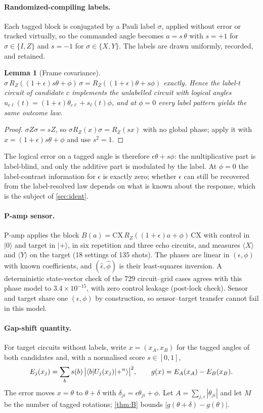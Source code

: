 \documentclass[10pt,twocolumn]{article}
\newtheorem{lemma}[theorem]{Lemma}
\theoremstyle{definition}
\theoremstyle{remark}
\newcommand{\eps}{\epsilon}
\newcommand{\RZ}{R_Z}
\begin{document}
\paragraph{Randomized-compiling labels.} Each tagged block is conjugated by a Pauli label $\sigma$, applied without error or tracked virtually, so the commanded angle becomes $a=s\,\theta$ with $s=+1$ for $\sigma\in\{I,Z\}$ and $s=-1$ for $\sigma\in\{X,Y\}$. The labels are drawn uniformly, recorded, and retained.

\begin{lemma}[Frame covariance]\label{lem:frame}
$\sigma\,\RZ((1+\eps)s\theta+\phi)\,\sigma=\RZ((1+\eps)\theta+s\phi)$ exactly. Hence the label-$t$ circuit of candidate $c$ implements the unlabelled circuit with logical angles $u_{c\ell}(t)=(1+\eps)\theta_{c\ell}+s_\ell(t)\phi$, and at $\phi=0$ every label pattern yields the same outcome law.
\end{lemma}
\begin{proof}
$\sigma Z\sigma=sZ$, so $\sigma\RZ(x)\sigma=\RZ(sx)$ with no global phase; apply it with $x=(1+\eps)s\theta+\phi$ and use $s^2=1$.
\end{proof}

The logical error on a tagged angle is therefore $\eps\theta+s\phi$: the multiplicative part is label-blind, and only the additive part is modulated by the label. At $\phi=0$ the label-contrast information for $\eps$ is exactly zero; whether $\eps$ can still be recovered from the label-resolved law depends on what is known about the response, which is the subject of \cref{sec:ident}.

\paragraph{P-amp sensor.} P-amp applies the block $B(a)=\mathrm{CX}\,\RZ((1+\eps)a+\phi)\,\mathrm{CX}$ with control in $|0\rangle$ and target in $|{+}\rangle$, in six repetition and three echo circuits, and measures $\langle X\rangle$ and $\langle Y\rangle$ on the target (18 settings of 135 shots). The phases are linear in $(\eps,\phi)$ with known coefficients, and $(\hat\eps,\hat\phi)$ is their least-squares inversion. A deterministic state-vector check of the 729 circuit--grid cases agrees with this phase model to $3.4\times10^{-15}$, with zero control leakage (post-lock check). Sensor and target share one $(\eps,\phi)$ by construction, so sensor--target transfer cannot fail in this model.

\paragraph{Gap-shift quantity.} For target circuits without labels, write $x=(x_A,x_B)$ for the tagged angles of both candidates and, with a normalised score $s\in[0,1]$,
\begin{gather*}
E_j(x_j)=\sum_b s(b)\,\bigl|\langle b|U_j(x_j)|{+}^n\rangle\bigr|^2,\qquad
g(x)=E_A(x_A)-E_B(x_B).
\end{gather*}
The error moves $x=\theta$ to $\theta+\delta$ with $\delta_{ji}=\eps\theta_{ji}+\phi$. Let $A=\sum_{j,i}|\theta_{ji}|$ and let $M$ be the number of tagged rotations; \cref{thm:B} bounds $|g(\theta+\delta)-g(\theta)|$.
\end{document}
